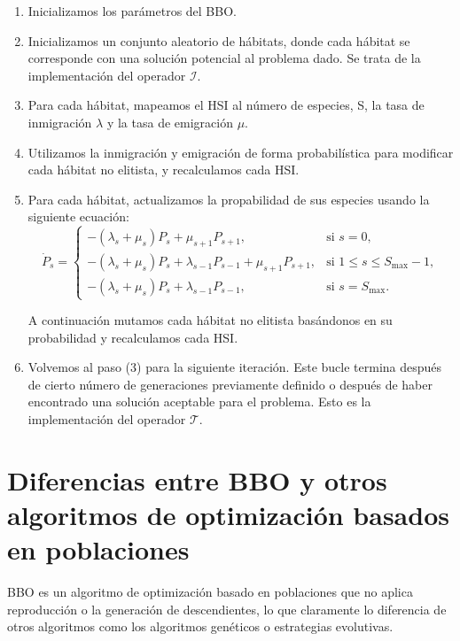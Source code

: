 \documentclass{article}
\begin{document}
\begin{enumerate}
    \item Inicializamos los parámetros del BBO. 
    \item Inicializamos un conjunto aleatorio de hábitats, donde cada hábitat se corresponde con una solución potencial al problema dado.
    Se trata de la implementación del operador $\mathcal{I}$.
    \item Para cada hábitat, mapeamos el HSI al número de especies, S, la tasa de inmigración $\lambda$ y la tasa de emigración $\mu$.
    \item Utilizamos la inmigración y emigración de forma probabilística para modificar cada hábitat no elitista, y recalculamos cada HSI.
    \item Para cada hábitat, actualizamos la propabilidad de sus especies usando la siguiente ecuación: 
    \[
    \dot{P}_s =
    \begin{cases}
    -(\lambda_s + \mu_s) P_s + \mu_{s+1} P_{s+1}, & \text{si } s = 0, \\[8pt]
    -(\lambda_s + \mu_s) P_s + \lambda_{s-1} P_{s-1} + \mu_{s+1} P_{s+1}, & \text{si } 1 \le s \le S_{\max}-1, \\[8pt]
    -(\lambda_s + \mu_s) P_s + \lambda_{s-1} P_{s-1}, & \text{si } s = S_{\max}.
    \end{cases}
    \]

    A continuación mutamos cada hábitat no elitista basándonos en su probabilidad y recalculamos cada HSI.

    \item Volvemos al paso (3) para la siguiente iteración. Este bucle termina después de cierto número de generaciones previamente definido o después de haber 
    encontrado una solución aceptable para el problema. Esto es la implementación del operador $\mathcal{T}$.

\end{enumerate}



\section{Diferencias entre BBO y otros algoritmos de optimización basados en poblaciones}

BBO es un algoritmo de optimización basado en poblaciones que no aplica reproducción o la generación de descendientes, lo que claramente lo diferencia de otros algoritmos como los algoritmos genéticos o estrategias evolutivas.
\end{document}
